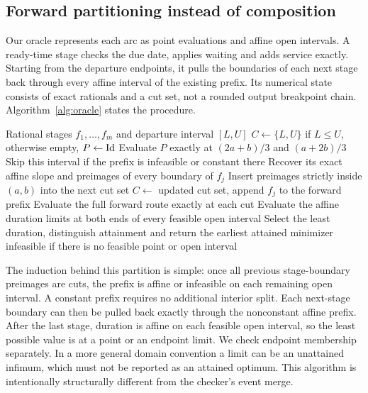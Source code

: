 \subsection{Forward partitioning instead of composition}

Our oracle represents each arc as point evaluations and affine open intervals. A ready-time stage checks the due date, applies waiting and adds service exactly. Starting from the departure endpoints, it pulls the boundaries of each next stage back through every affine interval of the existing prefix. Its numerical state consists of exact rationals and a cut set, not a rounded output breakpoint chain. Algorithm~\ref{alg:oracle} states the procedure.

\begin{algorithm}[htbp]
\caption{Independent rational route optimization}\label{alg:oracle}
\begin{algorithmic}[1]
\Require Rational stages $f_1,\dots,f_m$ and departure interval $[L,U]$
\State $C\gets\{L,U\}$ if $L\leq U$, otherwise empty, $P\gets\operatorname{Id}$
    \State Evaluate $P$ exactly at $(2a+b)/3$ and $(a+2b)/3$
    \State Skip this interval if the prefix is infeasible or constant there
    \State Recover its exact affine slope and preimages of every boundary of $f_j$
    \State Insert preimages strictly inside $(a,b)$ into the next cut set
  \EndFor
  \State $C\gets$ updated cut set, append $f_j$ to the forward prefix
\EndFor
\State Evaluate the full forward route exactly at each cut
\State Evaluate the affine duration limits at both ends of every feasible open interval
\State Select the least duration, distinguish attainment and return the earliest attained minimizer
\State \Return infeasible if there is no feasible point or open interval
\end{algorithmic}
\end{algorithm}

The induction behind this partition is simple: once all previous stage-boundary preimages are cuts, the prefix is affine or infeasible on each remaining open interval. A constant prefix requires no additional interior split. Each next-stage boundary can then be pulled back exactly through the nonconstant affine prefix. After the last stage, duration is affine on each feasible open interval, so the least possible value is at a point or an endpoint limit. We check endpoint membership separately. In a more general domain convention a limit can be an unattained infimum, which must not be reported as an attained optimum. This algorithm is intentionally structurally different from the checker's event merge.

